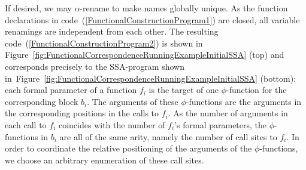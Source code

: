 If desired, we may $\alpha$-rename to make names globally unique. As
the function declarations in
code~(\ref{FunctionalConstructionProgram1}) are closed, all variable
renamings are independent from each other.  The resulting
code~(\ref{FunctionalConstructionProgram2}) is shown in
Figure~\ref{fig:FunctionalCorrespondenceRunningExampleInitialSSA}
(top) and corresponds precisely to the SSA-program shown
in~Figure~\ref{fig:FunctionalCorrespondenceRunningExampleInitialSSA}
(bottom): each formal parameter of a function $f_i$ is the target of
one $\phi$-function for the corresponding block $b_i$. The arguments
of these $\phi$-functions are the arguments in the corresponding
positions in the calls to $f_i$. As the number of arguments in each
call to $f_i$ coincides with the number of $f_i$'s formal parameters,
the $\phi$-functions in $b_i$ are all of the same arity, namely the
number of call sites to $f_i$. In order to coordinate the relative
positioning of the arguments of the $\phi$-functions, we choose an
arbitrary enumeration of these call sites.
